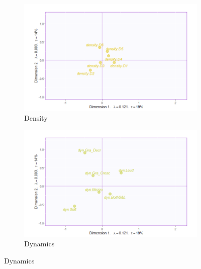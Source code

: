 \documentclass[
]{article}
\begin{document}
\begin{figure}[H]
\begin{subfigure}[b]{.45\linewidth}
\includegraphics[width=\linewidth]{./supmatsimgs/qjdensity.png}
\caption{Density}\label{fig:density}
\end{subfigure}
\begin{subfigure}[b]{.45\linewidth}
\includegraphics[width=\linewidth]{./supmatsimgs/qjdynamics.png}
\caption{Dynamics}\label{fig:dynamics}
\end{subfigure}


\end{figure}
\end{document}
